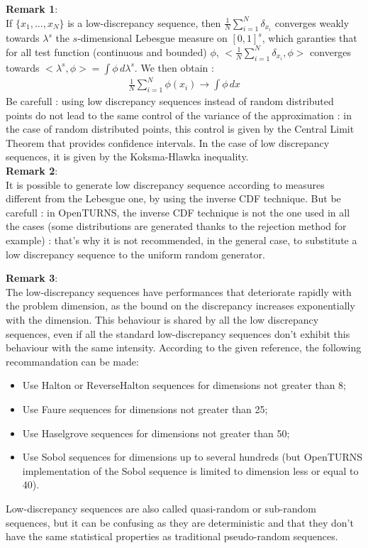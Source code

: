 {        {\bf Remark 1}: \\
        If $\{x_1, \hdots, x_N\}$ is a low-discrepancy sequence, then $\displaystyle \frac{1}{N} \sum_{i=1}^{N} \delta_{x_i}$ converges weakly towards $\lambda^s$ the $s$-dimensional Lebesgue measure on $[0,1]^s$, which garanties that for all test function (continuous and bounded) $\phi$,  $\displaystyle <\frac{1}{N} \sum_{i=1}^{N} \delta_{x_i},\phi>$ converges towards  $<\lambda^s, \phi> = \int \phi \, d\lambda^s$. We then obtain :
        \begin{align*}
          \displaystyle \frac{1}{N} \sum_{i=1}^{N} \phi(x_i) \longrightarrow \int \phi \, dx
        \end{align*}
        Be carefull : using low discrepancy sequences instead of random distributed points do not lead to the same control of the variance of the approximation : in the case of  random distributed points, this control is given by the Central Limit Theorem that provides confidence intervals. In the case of low discrepancy sequences, it is given by the Koksma-Hlawka inequality.\\

        {\bf Remark 2}: \\
        It is possible to generate low discrepancy sequence according to measures different from the Lebesgue one, by using the inverse CDF technique. But be carefull : in OpenTURNS, the inverse CDF technique is not the one used in all the cases (some distributions are generated thanks to the rejection method for example) : that's why it is not recommended, in the general case, to substitute a low discrepancy sequence to the uniform random  generator.

        {\bf Remark 3}: \\
        The low-discrepancy sequences have performances that deteriorate rapidly with the problem dimension, as the bound on the discrepancy increases exponentially with the dimension. This behaviour is shared by all the low discrepancy sequences, even if all the standard low-discrepancy sequences don't exhibit this behaviour with the same intensity. According to the given reference, the following recommandation can be made:
        \begin{itemize}
        \item Use Halton or ReverseHalton sequences for dimensions not greater than 8;
        \item Use Faure sequences for dimensions not greater than 25;
        \item Use Haselgrove sequences for dimensions not greater than 50;
        \item Use Sobol sequences for dimensions up to several hundreds (but OpenTURNS implementation of the Sobol sequence is limited to dimension less or equal to 40).
        \end{itemize}
      }
      {Low-discrepancy sequences are also called quasi-random or sub-random sequences, but it can be confusing as they are deterministic and that they don't have the same statistical properties as traditional pseudo-random sequences.}


